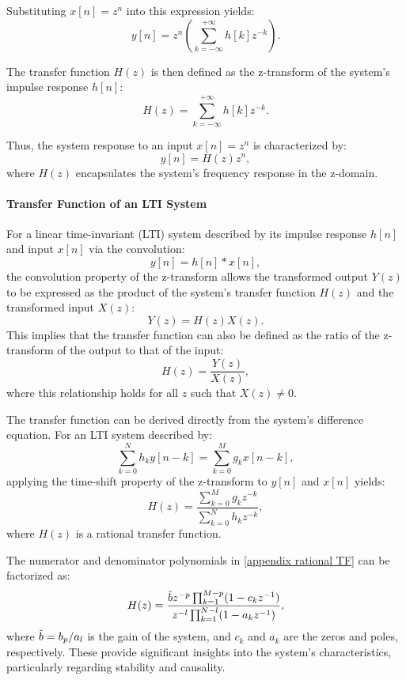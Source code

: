 Substituting \(x[n] = z^n\) into this expression yields:
\[
y[n] = z^n \left( \sum_{k=-\infty}^{+\infty} h[k] z^{-k} \right).
\]

The transfer function \(H(z)\) is then defined as the z-transform of the system's impulse response \(h[n]\):
\begin{equation}
H(z) = \sum_{k=-\infty}^{+\infty} h[k] z^{-k}. \label{appendix transfer function}
\end{equation}

Thus, the system response to an input \(x[n] = z^n\) is characterized by:
\[
y[n] = H(z) z^n,
\]
where \(H(z)\) encapsulates the system's frequency response in the z-domain.

\paragraph{Transfer Function of an LTI System}  
For a linear time-invariant (LTI) system described by its impulse response \(h[n]\) and input \(x[n]\) via the convolution:
\[
y[n] = h[n] \ast x[n],
\]
the convolution property of the z-transform allows the transformed output \(Y(z)\) to be expressed as the product of the system's transfer function \(H(z)\) and the transformed input \(X(z)\):
\[
Y(z) = H(z) X(z).
\]
This implies that the transfer function can also be defined as the ratio of the z-transform of the output to that of the input:
\[
H(z) = \frac{Y(z)}{X(z)},
\]
where this relationship holds for all \(z\) such that \(X(z) \neq 0\).

The transfer function can be derived directly from the system's difference equation. For an LTI system described by:
\[
\sum_{k=0}^N h_k y[n-k] = \sum_{k=0}^M g_k x[n-k],
\]
applying the time-shift property of the z-transform to \(y[n]\) and \(x[n]\) yields:
\begin{equation}
H(z) = \frac{\sum_{k=0}^M g_k z^{-k}}{\sum_{k=0}^N h_k z^{-k}},
\label{appendix rational TF}
\end{equation}
where \(H(z)\) is a rational transfer function.

The numerator and denominator polynomials in \eqref{appendix rational TF} can be factorized as:
\[
H(z) = \frac{\Tilde{b} z^{-p} \prod_{k=1}^{M-p} (1 - c_k z^{-1})}{z^{-l} \prod_{k=1}^{N-l} (1 - a_k z^{-1})},
\]
where \(\Tilde{b} = b_p / a_l\) is the gain of the system, and \(c_k\) and \(a_k\) are the zeros and poles, respectively. These provide significant insights into the system's characteristics, particularly regarding stability and causality.  

